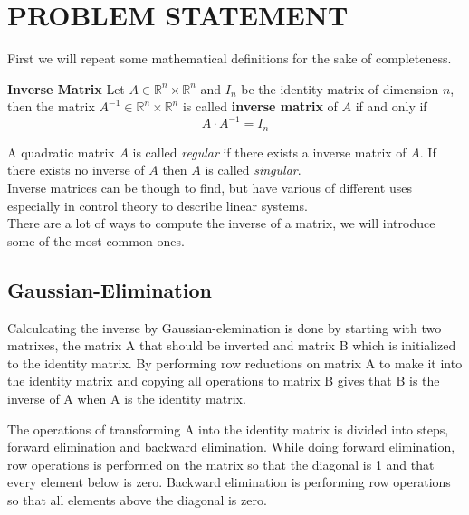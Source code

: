 

\section{PROBLEM STATEMENT}\label{sec:problem}
First we will repeat some mathematical definitions for the sake of completeness.
\begin{definition}
	\textbf{Inverse Matrix}
	Let $A \in \mathbb{R}^n \times \mathbb{R}^n$ and $I_n$ be the identity matrix of dimension $n$, then the matrix $A^{-1} \in \mathbb{R}^n \times \mathbb{R}^n$ is called \textbf{inverse matrix} of $A$ if and only if
	\begin{equation}\label{eq:inverse}
	A \cdot A^{-1} = I_n
	\end{equation}
\end{definition}
A quadratic matrix $A$ is called \emph{regular} if there exists a inverse matrix of $A$. If there exists no inverse of $A$ then $A$ is called \emph{singular}.\\
Inverse matrices can be though to find, but have various of different uses especially in control theory to describe linear systems.  
\vspace{0.2cm}\\
There are a lot of ways to compute the inverse of a matrix, we will introduce some of the most common ones.\\
\subsection*{Gaussian-Elimination}
Calculcating the inverse by Gaussian-elemination is done by starting with two matrixes, the matrix A that should be inverted and matrix B which is initialized to the identity matrix. By performing row reductions on matrix A to make it into the identity matrix and copying all operations to matrix B gives that B is the inverse of A when A is the identity matrix.

The operations of transforming A into the identity matrix is divided into steps, forward elimination and backward elimination.
While doing forward elimination, row operations is performed on the matrix so that the diagonal is 1 and that every element below is zero.
Backward elimination is performing row operations so that all elements above the diagonal is zero.


\vspace{0.2cm}\\
